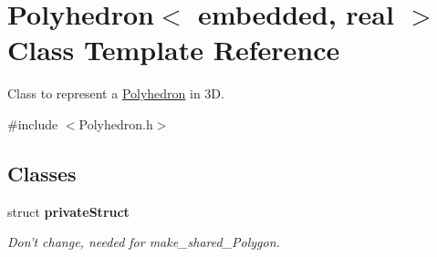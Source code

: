 \hypertarget{class_polyhedron}{\section{\-Polyhedron$<$ embedded, real $>$ \-Class \-Template \-Reference}
\label{class_polyhedron}
}


\-Class to represent a \hyperlink{class_polyhedron}{\-Polyhedron} in 3\-D.  




{\ttfamily \#include $<$\-Polyhedron.\-h$>$}

\subsection*{\-Classes}
\begin{DoxyCompactItemize}
\item 
struct {\bfseries private\-Struct}
\begin{DoxyCompactList}\small\item\em \-Don't change, needed for make\-\_\-shared\-\_\-\-Polygon. \end{DoxyCompactList}\end{DoxyCompactItemize}
